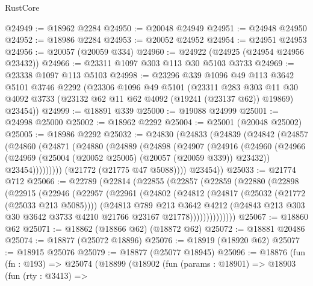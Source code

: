 \begin{lexlean}{RustCore}
\begin{coremodule}
@24949 := @18962 @2284
@24950 := @20048 @24949
@24951 := @24948 @24950
@24952 := @18986 @2284
@24953 := @20052 @24952
@24954 := @24951 @24953
@24956 := @20057 (@20059 @334)
@24960 := @24922 (@24925 (@24954 @24956 @23432))
@24966 := @23311 @1097 @303 @113 @30 @5103 @3733
@24969 := @23338 @1097 @113 @5103
@24998 := @23296
    @339
    @1096
    @49
    @113
    @3642
    @5101
    @3746
    @2292
    (@23306
      @1096
      @49
      @5101
      (@23311
        @283
        @303
        @11
        @30
        @4092
        @3733
        (@23132 @62 @11 @62 @4092 (@19241 (@23137 @62)) @19869)
        @23454))
@24999 := @18891 @339
@25000 := @19088 @24999
@25001 := @24998 @25000
@25002 := @18962 @2292
@25004 := @25001 (@20048 @25002)
@25005 := @18986 @2292
@25032 := @24830
    (@24833
      (@24839
        (@24842
          (@24857
            (@24860
              (@24871
                (@24880
                  (@24889
                    (@24898
                      (@24907
                        (@24916
                          (@24960
                            (@24966
                              (@24969 (@25004 (@20052 @25005) (@20057 (@20059 @339)) @23432))
                              @23454)))))))))
            (@21772 (@21775 @47 @5088))))
        @23454))
@25033 := @21774 @712
@25066 := @22789
    (@22814
      (@22855
        (@22857
          (@22859
            (@22880
              (@22898
                (@22915
                  (@22946
                    (@22957
                      (@22961
                        (@24802
                          (@24812
                            (@24817 (@25032 (@21772 (@25033 @213 @5085))))
                            (@24813
                              @789
                              @213
                              @3642
                              @4212
                              (@24843
                                @213
                                @303
                                @30
                                @3642
                                @3733
                                @4210
                                @21766
                                @23167
                                @21778))))))))))))))
@25067 := @18860 @62
@25071 := @18862 (@18866 @62) (@18872 @62)
@25072 := @18881 @20486
@25074 := @18877 (@25072 @18896)
@25076 := @18919 (@18920 @62)
@25077 := @18915 @25076
@25079 := @18877 (@25077 @18945)
@25096 := @18876
    (fun (fn : @193) =>
    @25074
      (@18899
        (@18902
          (fun (params : @18901) =>
          @18903
            (fun (rty : @3413) =>

\end{coremodule}
\end{lexlean}

